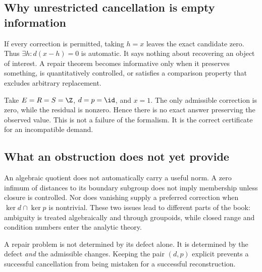 \subsection{Why unrestricted cancellation is empty information}
If every correction is permitted, taking \(h=x\) leaves the exact candidate zero. Thus \(\exists h:d(x-h)=0\) is automatic. It says nothing about recovering an object of interest. A repair theorem becomes informative only when it preserves something, is quantitatively controlled, or satisfies a comparison property that excludes arbitrary replacement.

\begin{example}
Take \(E=R=S=\Z\), \(d=p=\id\), and \(x=1\). The only admissible correction is zero, while the residual is nonzero. Hence there is no exact answer preserving the observed value. This is not a failure of the formalism. It is the correct certificate for an incompatible demand.
\end{example}

\subsection{What an obstruction does not yet provide}
An algebraic quotient does not automatically carry a useful norm. A zero infimum of distances to its boundary subgroup does not imply membership unless closure is controlled. Nor does vanishing supply a preferred correction when \(\ker d\cap\ker p\) is nontrivial. These two issues lead to different parts of the book: ambiguity is treated algebraically and through groupoids, while closed range and condition numbers enter the analytic theory.

\begin{insight}
A repair problem is not determined by its defect alone. It is determined by the defect \emph{and} the admissible changes. Keeping the pair \((d,p)\) explicit prevents a successful cancellation from being mistaken for a successful reconstruction.
\end{insight}
